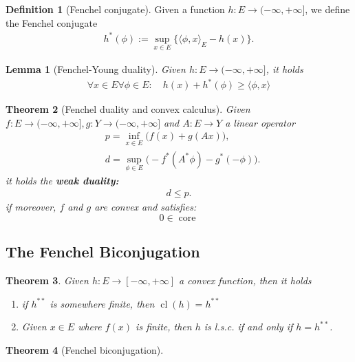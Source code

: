 \documentclass[a4paper,11pt,fleqn, draft]{book}
\newtheorem{theorem}{Theorem}[section]
\newtheorem{lemma}[theorem]{Lemma}
\theoremstyle{definition}
\newtheorem{definition}{Definition}[section]
\theoremstyle{remark}
\DeclareMathOperator*{\core}{core}
\DeclareMathOperator*{\cl}{cl}
\begin{document}
\begin{definition}[Fenchel conjugate]
Given a function $h: E \rightarrow (-\infty, +\infty]$, we define the Fenchel conjugate 
\begin{align*}
	h^*(\phi):= \sup_{x \in E} \bigg\{ \langle \phi, x\rangle_E - h(x) \bigg\}. 
\end{align*}
\end{definition}



\begin{lemma}[Fenchel-Young duality]
	Given $h:E \rightarrow (-\infty, +\infty]$, it holds
	\begin{align*}
		\forall x \in E \forall \phi \in E: \quad  h(x) + h^*(\phi) \ge \langle \phi, x\rangle
	\end{align*}
\end{lemma}

\begin{theorem}[Fenchel duality and convex calculus]
Given $f: E \rightarrow (-\infty, +\infty], g: Y \rightarrow (-\infty, + \infty]$ and $A: E \rightarrow Y$ a linear operator
\begin{align*}
	& p = \inf_{x \in E} \bigg( f(x) + g(A x) \bigg), \\
	& d = \sup_{\phi \in E} \bigg(-f^*(A^* \phi ) - g^*(- \phi) \bigg). 
\end{align*}
it holds the \textbf{weak duality:}
\begin{align*}
	d \le p.
\end{align*}
if moreover, $f$ and $g$ are convex and satisfies: 
$$
0 \in \core
$$
\end{theorem}


\subsection{The Fenchel Biconjugation}


\begin{theorem}
	Given $h: E \rightarrow [-\infty, +\infty]$ a convex function, then it holds
	\begin{enumerate}
		\item if $h^{**}$ is somewhere finite, then $\cl(h) = h^{**}$
		\item Given $x \in E$ where $f(x)$ is finite, then $h$ is l.s.c. if and only if $h = h^{**}$. 
	\end{enumerate}
\end{theorem}

\begin{theorem}[Fenchel biconjugation]
\end{theorem}
\end{document}
